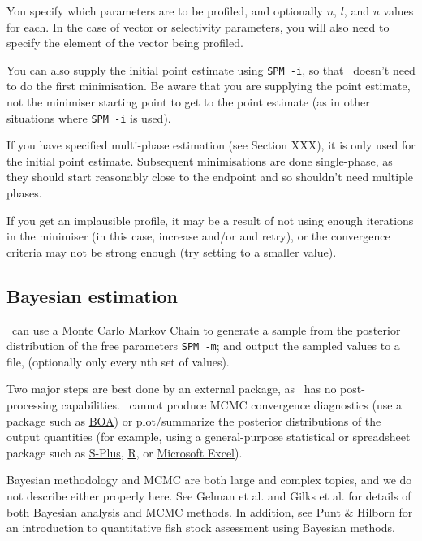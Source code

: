 You specify which parameters are to be profiled, and optionally $n$, $l$, and $u$ values for each. In the case of vector or selectivity parameters, you will also need to specify the element of the vector being profiled. 

You can also supply the initial point estimate using \texttt{SPM -i}, so that \SPM\ doesn't need to do the first minimisation. Be aware that you are supplying the point estimate, not the minimiser starting point to get to the point estimate (as in other situations where \texttt{SPM -i} is used).

If you have specified multi-phase estimation (see Section XXX), it is only used for the initial point estimate. Subsequent minimisations are done single-phase, as they should start reasonably close to the endpoint and so shouldn't need multiple phases.

If you get an implausible profile, it may be a result of not using enough iterations in the minimiser (in this case, increase  and/or  and retry), or the convergence criteria may not be strong enough (try setting  to a smaller value).

\subsection{Bayesian estimation}

\SPM\ can use a Monte Carlo Markov Chain to generate a sample from the posterior distribution of the free parameters \texttt{SPM -m}; and output the sampled values to a file, (optionally only every nth set of values).

Two major steps are best done by an external package, as \SPM\ has no post-processing capabilities. \SPM\ cannot produce MCMC convergence diagnostics (use a package such as \href{http://www.public-health.uiowa.edu/boa}{BOA}) or plot/summarize the posterior distributions of the output quantities (for example, using a general-purpose statistical or spreadsheet package such as \href{http://www.insightful.com}{S-Plus}, \href{http://www.r-project.org}{R}, or \href{http://www.microsoft.com}{Microsoft Excel}).

Bayesian methodology and MCMC are both large and complex topics, and we do not describe either properly here. See Gelman et al. \citeyearpar{823} and Gilks et al. \citeyearpar{143} for details of both Bayesian analysis and MCMC methods. In addition, see Punt \& Hilborn \citeyearpar{828} for an introduction to quantitative fish stock assessment using Bayesian methods. 

